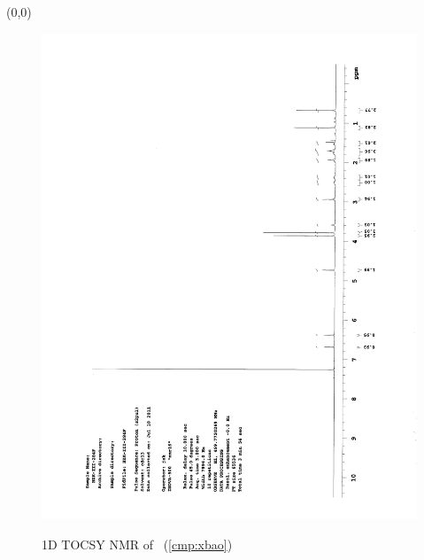 \clearpage
\begin{textblock}{20}(0,0)
\begin{figure}[htb]
\caption{1D TOCSY NMR of  \CMPxbao\ (\ref{cmp:xbao})}
\includegraphics[scale=0.35, trim = 20mm 15mm 10mm 15mm,
clip, angle=270]{chp_singlecarbon/images/nmr/xbaoH} \\

\end{figure}
\end{textblock}
